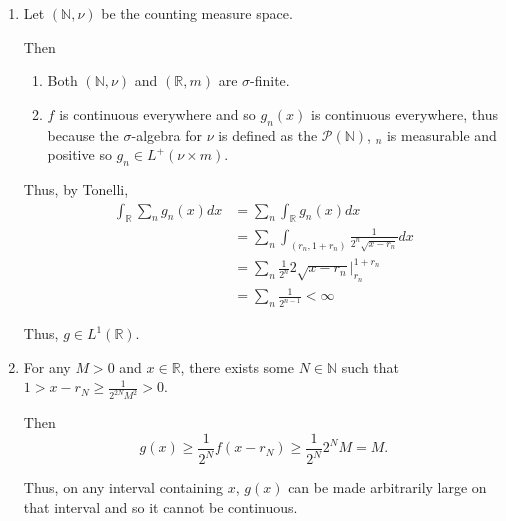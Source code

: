 \documentclass[12pt]{Qual}
\begin{document}
\begin{solution}$\,$
\begin{enumerate}[label=(\alph*)]
    \item Let $(\mathbb{N},\nu)$ be the counting measure space.

    Then \begin{enumerate}[label=(\roman*)]
        \item Both $(\mathbb{N},\nu)$ and $(\mathbb{R},m)$ are $\sigma$-finite.
        \item $f$ is continuous everywhere and so $g_n(x)$ is continuous everywhere, thus because the $\sigma$-algebra for $\nu$ is defined as the $\mathscr{P}(\mathbb{N})$, $_n$ is measurable and positive so $g_n\in L^+(\nu\times m)$.
    \end{enumerate}

    Thus, by Tonelli, \begin{align*}
        \int_\mathbb{R}\sum_n g_n(x)dx&=\sum_n\int_\mathbb{R}g_n(x)dx\\
        &=\sum_n\int_{(r_n,1+r_n)}\frac{1}{2^n\sqrt{x-r_n}}dx\\
        &=\sum_n\frac{1}{2^n}2\sqrt{x-r_n}\bigg|_{r_n}^{1+r_n}\\
        &=\sum_n\frac{1}{2^{n-1}}<\infty
    \end{align*}

    Thus, $g\in L^1(\mathbb{R})$.
    \item For any $M>0$ and $x\in\mathbb{R}$, there exists some $N\in\mathbb{N}$ such that $1>x-r_N\ge\frac{1}{2^{2N}M^2}>0$.

    Then $$g(x)\ge \frac{1}{2^N}f(x-r_N)\ge \frac{1}{2^N}2^NM=M.$$

    Thus, on any interval containing $x$, $g(x)$ can be made arbitrarily large on that interval and so it cannot be continuous.

\begin{comment}
    Let $x\in\mathbb{R}$ and $\varepsilon>0$ be given. Then assume that $g$ is continuous at $x$.

    Then for all $y$ satisfying $|y-x|<\delta$, $|g(x)-g(y)|<\varepsilon$.

    However, for all $\delta>0$, there exists some $N\in\mathbb{N}$ such that $x<r_N<x+\delta$. Then, $|x-r_N|<\delta$, but since $f(r_N-r_N)=0$, $$|\sum_{n=1}^\infty g_n(x)-\sum_{n=1}^\infty g_n(r_N)|=|\sum_{n=1}^Ng_n(x)-\sum_{n=1}^Ng_n(r_N)|\ge \frac{1}{2^N}$$
\end{comment}
\end{enumerate}
\end{solution}
\vspace{0.5cm}
\end{document}
